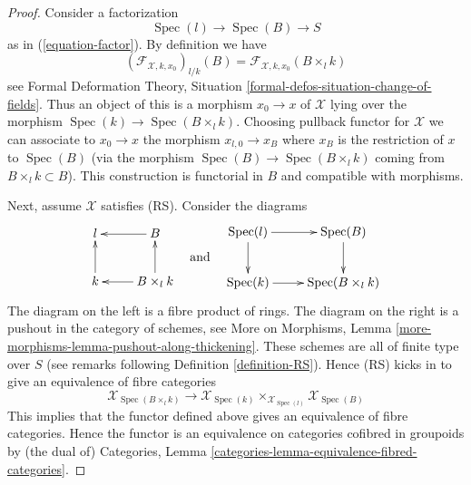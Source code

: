 \documentclass[10pt,a4paper]{amsart}
\theoremstyle{plain}
\theoremstyle{definition}
\theoremstyle{remark}
\numberwithin{equation}{subsection}
\def\Spec{\mathop{\mathrm{Spec}}}
\begin{document}
\begin{proof}
Consider a factorization
$$
\Spec(l) \to \Spec(B) \to S
$$
as in (\ref{equation-factor}). By definition we have
$$
(\mathcal{F}_{\mathcal{X}, k , x_0})_{l/k}(B) =
\mathcal{F}_{\mathcal{X}, k, x_0}(B \times_l k)
$$
see Formal Deformation Theory, Situation
\ref{formal-defos-situation-change-of-fields}. Thus an object of this
is a morphism $x_0 \to x$ of $\mathcal{X}$ lying over the morphism
$\Spec(k) \to \Spec(B \times_l k)$. Choosing pullback functor for $\mathcal{X}$
we can associate to $x_0 \to x$ the morphism $x_{l, 0} \to x_B$
where $x_B$ is the restriction of $x$ to $\Spec(B)$ (via the morphism
$\Spec(B) \to \Spec(B \times_l k)$ coming from $B \times_l k \subset B$).
This construction is functorial in $B$ and compatible with morphisms.

\medskip\noindent
Next, assume $\mathcal{X}$ satisfies (RS). Consider the diagrams
$$
\vcenter{
\xymatrix{
l & B \ar[l] \\
k \ar[u] & B \times_l k \ar[l] \ar[u]
}
}
\quad\text{and}\quad
\vcenter{
\xymatrix{
\Spec(l) \ar[d] \ar[r] & \Spec(B) \ar[d] \\
\Spec(k) \ar[r] & \Spec(B \times_l k)
}
}
$$
The diagram on the left is a fibre product of rings. The diagram on the
right is a pushout in the category of schemes, see
More on Morphisms, Lemma \ref{more-morphisms-lemma-pushout-along-thickening}.
These schemes are all of finite type over $S$ (see remarks following
Definition \ref{definition-RS}). Hence (RS) kicks in to give an equivalence
of fibre categories
$$
\mathcal{X}_{\Spec(B \times_l k)}
\longrightarrow
\mathcal{X}_{\Spec(k)}
\times_{\mathcal{X}_{\Spec(l)}}
\mathcal{X}_{\Spec(B)}
$$
This implies that the functor defined above gives an equivalence of
fibre categories. Hence the functor is an equivalence on categories
cofibred in groupoids by (the dual of)
Categories, Lemma \ref{categories-lemma-equivalence-fibred-categories}.
\end{proof}
\end{document}
